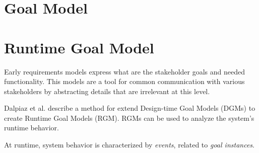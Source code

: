 \section{Goal Model}



\section{Runtime Goal Model}
Early requirements models express what are the stakeholder goals and needed functionality. This models are a tool for common communication with various stakeholders by abstracting details that are irrelevant at this level\cite{dalpiaz_runtime_2013}.

Dalpiaz et al.\cite{dalpiaz_runtime_2013} describe a method for extend Design-time Goal Models (DGMs) to create Runtime Goal Models (RGM). RGMs can be used to analyze the system's runtime behavior.

At runtime, system behavior is characterized by \textit{events}, related to \textit{goal instances}.
